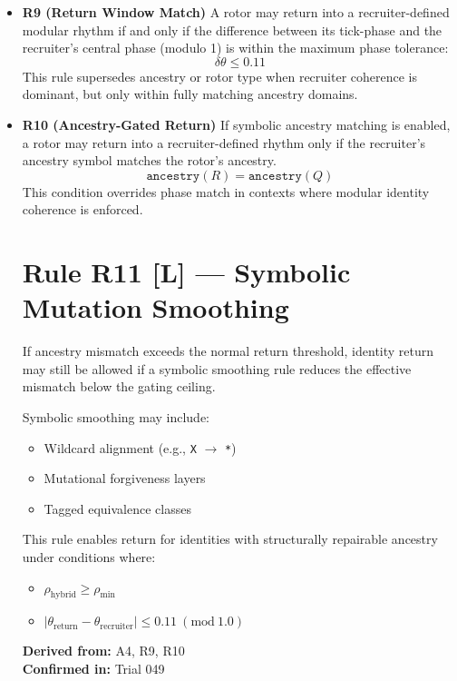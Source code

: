 \documentclass[12pt]{article}
\begin{document}
\begin{itemize}

\item \textbf{R9 (Return Window Match)} A rotor may return into a recruiter-defined modular rhythm if and only if the difference between its tick-phase and the recruiter’s central phase (modulo 1) is within the maximum phase tolerance:
\begin{equation}
\delta\theta \le 0.11
\label{eq:return_window_tolerance}
\end{equation}
This rule supersedes ancestry or rotor type when recruiter coherence is dominant, but only within fully matching ancestry domains.

\item \textbf{R10 (Ancestry-Gated Return)} If symbolic ancestry matching is enabled, a rotor may return into a recruiter-defined rhythm only if the recruiter's ancestry symbol matches the rotor's ancestry.
\begin{equation}
\texttt{ancestry}(R) = \texttt{ancestry}(Q)
\label{eq:ancestry_gate}
\end{equation}
This condition overrides phase match in contexts where modular identity coherence is enforced.

\section*{Rule R11 [L] — Symbolic Mutation Smoothing}

If ancestry mismatch exceeds the normal return threshold, identity return may still be allowed if a symbolic smoothing rule reduces the effective mismatch below the gating ceiling.

Symbolic smoothing may include:
\begin{itemize}
    \item Wildcard alignment (e.g., \texttt{X} $\rightarrow$ \texttt{*})
    \item Mutational forgiveness layers
    \item Tagged equivalence classes
\end{itemize}

This rule enables return for identities with structurally repairable ancestry under conditions where:
\begin{itemize}
    \item $\rho_{\text{hybrid}} \ge \rho_{\min}$
    \item $|\theta_{\text{return}} - \theta_{\text{recruiter}}| \le 0.11 \ (\text{mod} \ 1.0)$
\end{itemize}

\textbf{Derived from:} A4, R9, R10 \\
\textbf{Confirmed in:} Trial 049


\end{itemize}
\end{document}
